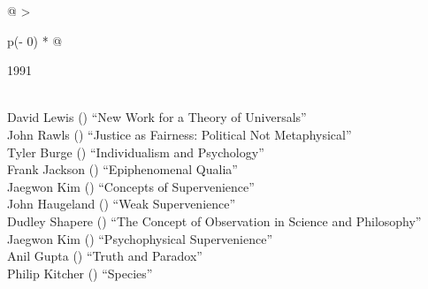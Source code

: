 \documentclass[
  10pt,
  letterpaper,
  DIV=11,
  numbers=noendperiod,
  twoside]{scrartcl}
\begin{document}
\begin{longtable}[]{@{}
  >{\raggedright\arraybackslash}p{(\columnwidth - 0\tabcolsep) * }@{}}

\caption{\label{tbl-top-ten-1982}Most cited articles published less than
ten years ago as of 1991.}

\tabularnewline

\toprule\noalign{}
\begin{minipage}[b]{\linewidth}\raggedright
1991
\end{minipage} \\
\midrule\noalign{}
\endhead
\bottomrule\noalign{}
\endlastfoot
David Lewis
()
``New Work for a Theory of Universals'' \\
John Rawls
()
``Justice as Fairness: Political Not Metaphysical'' \\
Tyler Burge
()
``Individualism and Psychology'' \\
Frank Jackson
()
``Epiphenomenal Qualia'' \\
Jaegwon Kim
()
``Concepts of Supervenience'' \\
John Haugeland
()
``Weak Supervenience'' \\
Dudley Shapere
()
``The Concept of Observation in Science and Philosophy'' \\
Jaegwon Kim
()
``Psychophysical Supervenience'' \\
Anil Gupta
()
``Truth and Paradox'' \\
Philip Kitcher
()
``Species'' \\

\end{longtable}
\end{document}
